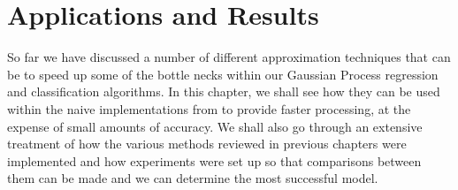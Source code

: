 \section{Applications and Results}\label{Chapter5}

So far we have discussed a number of different approximation techniques that can be to speed up some of the bottle necks within our Gaussian Process regression and classification algorithms. In this chapter, we shall see how they can be used within the naive implementations from  to provide faster processing, at the expense of small amounts of accuracy. We shall also go through an extensive treatment of how the various methods reviewed in previous chapters were implemented and how experiments were set up so that comparisons between them can be made and we can determine the most successful model.







